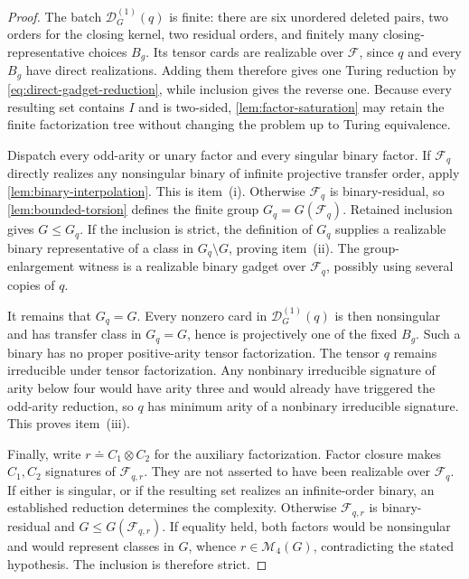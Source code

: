 \documentclass[11pt,letterpaper,onecolumn]{article}
\theoremstyle{plain}
\theoremstyle{definition}
\theoremstyle{remark}
\newcommand{\cF}{\mathcal F}
\begin{document}
\begin{proof}
The batch \(\mathscr D_G^{(1)}(q)\) is finite: there are six unordered
deleted pairs, two orders for the closing kernel, two residual orders, and
finitely many closing-representative choices \(B_g\).  Its tensor cards are
realizable over \(\cF\), since \(q\) and every \(B_g\) have direct realizations.  Adding them therefore gives one Turing reduction by
\cref{eq:direct-gadget-reduction}, while inclusion gives the reverse one.
Because every resulting set contains \(I\) and is two-sided,
\cref{lem:factor-saturation} may retain the finite factorization tree without
changing the problem up to Turing equivalence.

Dispatch every odd-arity or unary factor and every singular binary factor.
If \(\cF_q\) directly realizes any nonsingular binary of infinite
projective transfer order, apply \cref{lem:binary-interpolation}. This is
item~(i).  Otherwise \(\cF_q\) is binary-residual, so
\cref{lem:bounded-torsion} defines the finite group
\(G_q=G(\cF_q)\).  Retained inclusion gives \(G\le G_q\).  If the
inclusion is strict, the definition of \(G_q\) supplies a realizable binary
representative of a class in \(G_q\setminus G\), proving item~(ii).
The group-enlargement witness is a realizable binary gadget over \(\cF_q\), possibly
using several copies of \(q\).

It remains that \(G_q=G\).  Every nonzero card in
\(\mathscr D_G^{(1)}(q)\) is then nonsingular and has transfer class in
\(G_q=G\), hence is projectively one of the fixed \(B_g\).  Such a binary
has no proper positive-arity tensor factorization.  The tensor \(q\) remains
irreducible under tensor factorization.  Any nonbinary irreducible signature of arity below four would have
arity three and would already have triggered the odd-arity reduction, so
\(q\) has minimum arity of a nonbinary irreducible signature.  This proves item~(iii).

Finally, write \(r\doteq C_1\otimes C_2\) for the auxiliary factorization.
Factor closure makes \(C_1,C_2\) signatures of
\(\cF_{q,r}\). They are not asserted to have been realizable over
\(\cF_q\).  If either is singular, or if the resulting set realizes an infinite-order binary, an established reduction determines the complexity.  Otherwise
\(\cF_{q,r}\) is binary-residual and
\(G\le G(\cF_{q,r})\).  If equality held, both factors would be
nonsingular and would represent classes in \(G\), whence
\(r\in\mathcal M_4(G)\), contradicting the stated hypothesis.  The inclusion
is therefore strict.
\end{proof}
\end{document}
